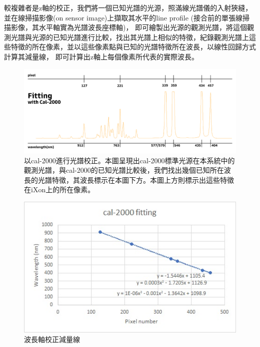 \documentclass[12pt]{article}
\begin{document}
較複雜者是z軸的校正，我們將一個已知光譜的光源，照滿線光譜儀的入射狹縫，並在線掃描影像(on sensor image)上擷取其水平的line profile (接合前的單張線掃描影像，其水平軸實為光譜波長座標軸)，
即可繪製出光源的觀測光譜，將這個觀測光譜與光源的已知光譜進行比較，找出其光譜上相似的特徵，紀錄觀測光譜上這些特徵的所在像素，並以這些像素點與已知的光譜特徵所在波長，以線性回歸方式計算其減量線，
即可計算出z軸上每個像素所代表的實際波長。

\begin{figure}[h]
    \centering
    \includegraphics[width=\linewidth]{fitting.jpg}
    \caption[以cal-2000進行光譜校正]{以cal-2000進行光譜校正。本圖呈現出cal-2000標準光源在本系統中的觀測光譜，與cal-2000的已知光譜比較後，我們找出幾個已知所在波長的光譜特徵，其波長標示在本圖下方。本圖上方則標示出這些特徵在iXon上的所在像素。}
    \label{figure: fitting}
\end{figure}
\begin{figure}[h]
    \centering
    \includegraphics[width=\linewidth]{cal-2000fitting.jpg}
    \caption{波長軸校正減量線}
    \label{figure: fit curve}
\end{figure}
\end{document}
